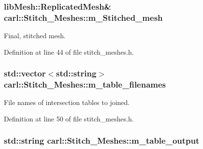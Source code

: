 \subsubsection[{m\+\_\+\+Stitched\+\_\+mesh}]{\setlength{\rightskip}{0pt plus 5cm}lib\+Mesh\+::\+Replicated\+Mesh\& carl\+::\+Stitch\+\_\+\+Meshes\+::m\+\_\+\+Stitched\+\_\+mesh\hspace{0.3cm}{\ttfamily [protected]}}\label{classcarl_1_1_stitch___meshes_abebb40f413d1dbce1d74f9280e978ed7}


Final, stitched mesh. 



Definition at line 44 of file stitch\+\_\+meshes.\+h.

\hypertarget{classcarl_1_1_stitch___meshes_a45f392e103d8b859857981971165dc0d}{}
\subsubsection[{m\+\_\+table\+\_\+filenames}]{\setlength{\rightskip}{0pt plus 5cm}std\+::vector$<$std\+::string$>$ carl\+::\+Stitch\+\_\+\+Meshes\+::m\+\_\+table\+\_\+filenames\hspace{0.3cm}{\ttfamily [protected]}}\label{classcarl_1_1_stitch___meshes_a45f392e103d8b859857981971165dc0d}


File names of intersection tables to joined. 



Definition at line 50 of file stitch\+\_\+meshes.\+h.

\hypertarget{classcarl_1_1_stitch___meshes_a306da20eddb64d29bb1f7b50c4b45a5e}{}
\subsubsection[{m\+\_\+table\+\_\+output}]{\setlength{\rightskip}{0pt plus 5cm}std\+::string carl\+::\+Stitch\+\_\+\+Meshes\+::m\+\_\+table\+\_\+output\hspace{0.3cm}{\ttfamily [protected]}}\label{classcarl_1_1_stitch___meshes_a306da20eddb64d29bb1f7b50c4b45a5e}


